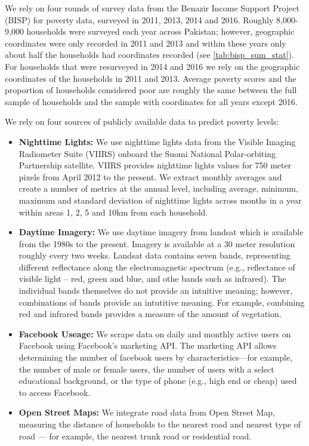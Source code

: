 \documentclass[8pt, oneside]{article}
\begin{document}
We rely on four rounds of survey data from the Benazir Income Support Project (BISP) for poverty data, surveyed in 2011, 2013, 2014 and 2016. Roughly 8,000-9,000 households were surveyed each year across Pakistan; however, geographic coordinates were only recorded in 2011 and 2013 and within these years only about half the households had coordinates recorded (see \autoref{tab:bisp_sum_stat}). For households that were resurveyed in 2014 and 2016 we rely on the geographic coordinates of the households in 2011 and 2013. Average poverty scores and the proportion of households considered poor are roughly the same between the full sample of households and the sample with coordinates for all years except 2016.
\par
We rely on four sources of publicly available data to predict poverty levels:
\begin{itemize}
\item {\bf Nighttime Lights:} We use nighttime lights data from the Visible Imaging Radiometer Suite (VIIRS) onboard the Suomi National Polar-orbiting Partnership satellite. VIIRS provides nighttime lights values for 750 meter pixels from April 2012 to the present. We extract monthly averages and create a number of metrics at the annual level, including average, minimum, maximum and standard deviation of nighttime lights across months in a year within areas 1, 2, 5 and 10km from each household. 
\item {\bf Daytime Imagery:} We use daytime imagery from landsat which is available from the 1980s to the present. Imagery is available at a 30 meter resolution roughly every two weeks. Landsat data contains seven bands, representing different reflectance along the electromagnetic spectrum (e.g., reflectance of visible light -- red, green and blue, and othe bands such as infrared). The individual bands themselves do not provide an intuitive meaning; however, combinations of bands provide an intutitive meaning. For example, combining red and infrared bands provides a measure of the amount of vegetation.
\item {\bf Facebook Useage:} We scrape data on daily and monthly active users on Facebook using Facebook's marketing API. The marketing API allows determining the number of facebook users by characteristics---for example, the number of male or female users, the number of users with a select educational background, or the type of phone (e.g., high end or cheap) used to access Facebook. 
\item {\bf Open Street Maps:} We integrate road data from Open Street Map, measuring the distance of households to the nearest road and nearest type of road --- for example, the nearest trunk road or residential road.
\end{itemize}
\end{document}
